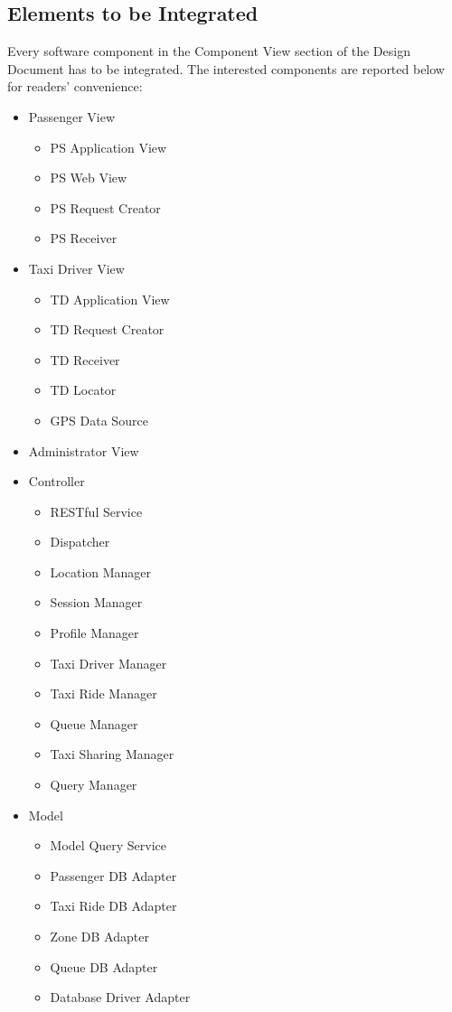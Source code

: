 \subsection{Elements to be Integrated}
Every software component in the Component View section of the Design Document has to be integrated.
The interested components are reported below for readers' convenience:
\begin{itemize}
	\item Passenger View
	\begin{itemize}
		\item PS Application View
		\item PS Web View
		\item PS Request Creator
		\item PS Receiver
	\end{itemize}
	\item Taxi Driver View
	\begin{itemize}
		\item TD Application View
		\item TD Request Creator
		\item TD Receiver
		\item TD Locator
		\item GPS Data Source
	\end{itemize}
	\item Administrator View
	\item Controller
	\begin{itemize}
		\item RESTful Service
		\item Dispatcher
		\item Location Manager
		\item Session Manager
		\item Profile Manager
		\item Taxi Driver Manager
		\item Taxi Ride Manager
		\item Queue Manager
		\item Taxi Sharing Manager
		\item Query Manager
	\end{itemize}
	\item Model
	\begin{itemize}
		\item Model Query Service
		\item Passenger DB Adapter
		\item Taxi Ride DB Adapter
		\item Zone DB Adapter
		\item Queue DB Adapter
		\item Database Driver Adapter
	\end{itemize}
\end{itemize}
